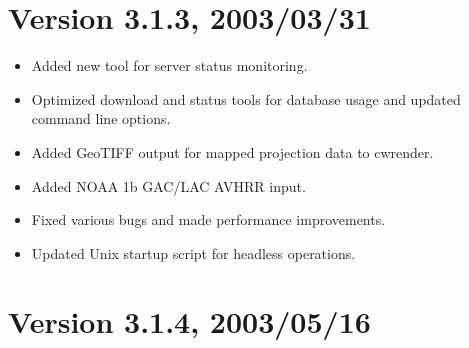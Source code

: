

\section*{Version 3.1.3, 2003/03/31}

\begin{itemize}

  \item Added new tool for server status monitoring.

  \item Optimized download and status tools for database usage and
  updated command line options.

  \item Added GeoTIFF output for mapped projection data to cwrender.

  \item Added NOAA 1b GAC/LAC AVHRR input.

  \item Fixed various bugs and made performance improvements.

  \item Updated Unix startup script for headless operations.

\end{itemize}




\section*{Version 3.1.4, 2003/05/16}

